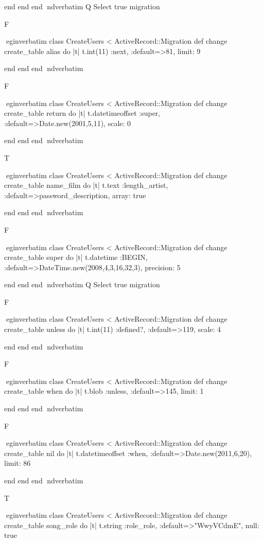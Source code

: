     end 
  end 
end
nd{verbatim}
Q
 Select true migration

F

egin{verbatim}
 class CreateUsers < ActiveRecord::Migration 
  def change 
    create_table alias do |t| 
      t.int(11) :next, :default=>81, limit: 9
    
    end 
  end 
end
nd{verbatim}

F

egin{verbatim}
 class CreateUsers < ActiveRecord::Migration 
  def change 
    create_table return do |t| 
      t.datetimeoffset :super, :default=>Date.new(2001,5,11), scale: 0
    
    end 
  end 
end
nd{verbatim}

T

egin{verbatim}
 class CreateUsers < ActiveRecord::Migration 
  def change 
    create_table name_film do |t| 
      t.text :length_artist, :default=>password_description, array: true
    
    end 
  end 
end
nd{verbatim}

F

egin{verbatim}
 class CreateUsers < ActiveRecord::Migration 
  def change 
    create_table super do |t| 
      t.datetime :BEGIN, :default=>DateTime.new(2008,4,3,16,32,3), precision: 5
    
    end 
  end 
end
nd{verbatim}
Q
 Select true migration

F

egin{verbatim}
 class CreateUsers < ActiveRecord::Migration 
  def change 
    create_table unless do |t| 
      t.int(11) :defined?, :default=>119, scale: 4
    
    end 
  end 
end
nd{verbatim}

F

egin{verbatim}
 class CreateUsers < ActiveRecord::Migration 
  def change 
    create_table when do |t| 
      t.blob :unless, :default=>145, limit: 1
    
    end 
  end 
end
nd{verbatim}

F

egin{verbatim}
 class CreateUsers < ActiveRecord::Migration 
  def change 
    create_table nil do |t| 
      t.datetimeoffset :when, :default=>Date.new(2011,6,20), limit: 86
    
    end 
  end 
end
nd{verbatim}

T

egin{verbatim}
 class CreateUsers < ActiveRecord::Migration 
  def change 
    create_table song_role do |t| 
      t.string :role_role, :default=>"WwyVCdmE", null: true
    
